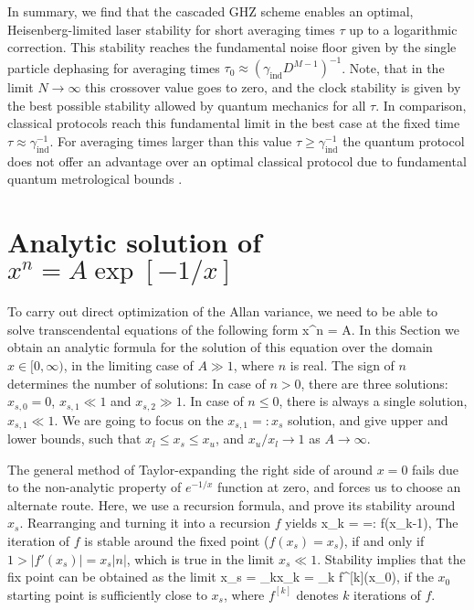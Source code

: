 In summary, we find that the cascaded GHZ scheme enables an optimal,
Heisenberg-limited laser stability for short averaging times $\tau$ up to a
logarithmic correction. This stability reaches the fundamental noise floor given
by the single particle dephasing for averaging times $\tau_0 \approx
(\gamma_\mathrm{ind}D^{M-1} )^{-1}$. Note, that in the limit $N\rightarrow
\infty$ this crossover value goes to zero, and the clock stability is given by
the best possible stability allowed by quantum mechanics for all $\tau$. In
comparison, classical protocols reach this fundamental limit in the best case
\cite{Rosenband2013} at the fixed time $\tau \approx \gamma_\mathrm{ind}^{-1}$.
For averaging times larger than this value $\tau\geq \gamma_\mathrm{ind}^{-1}$
the quantum protocol does not offer an advantage over an optimal classical
protocol due to fundamental quantum metrological bounds \cite{Escher:2011fn}.

\section{Analytic solution of $x^n = A\exp[-1/x]$}
\label{sec:Transcendental eq}
To carry out direct optimization of the Allan variance, we need to be able to
solve transcendental equations of the following form
\bel
	\label{eq:Transcendental_eq}
	x^n = A\exp{}.
\eel
In this Section we obtain an analytic formula for the solution of this equation
over the domain $x\in [0,\infty)$, in the limiting case of $A \gg 1$, where $n$
is real. The sign of $n$ determines the number of solutions: In case of $n>0$,
there are three solutions: $x_{s,0} = 0$, $x_{s,1}\ll 1$ and $x_{s,2}\gg 1$. In
case of $n\leq 0$, there is always a single solution, $x_{s,1} \ll 1$. We are
going to focus on the $x_{s,1} =: x_s$ solution, and give upper and lower
bounds, such that $x_l \leq x_s \leq x_u$, and $x_u/x_l \rightarrow 1$ as $A\rightarrow
\infty$.

The general method of Taylor-expanding the
right side of   around $x=0$ fails due to the
non-analytic property of $e^{-1/x}$ function at zero, and forces us to choose an
alternate route. Here, we use a recursion formula, and prove its stability
around $x_s$. Rearranging  and turning it into
a recursion $f$ yields
\bel
	\label{eq:recursion}
	x_{k} =
	 =: f(x_{k-1}),
\eel 
The iteration of $f$ is stable around the
fixed point ($f(x_s) = x_s$), if and only if $1 > |f'(x_s)| = x_s |n|$,
which is true in the limit $x_s \ll 1$. Stability implies that the fix point can
be obtained as the limit
\bel
	x_s = \lim_{k\rightarrow \infty}x_k = \lim_{k\rightarrow \infty} f^{[k]}(x_0),
\eel
if the $x_0$ starting point is sufficiently close to $x_s$,  where $f^{[k]}$
denotes $k$ iterations of $f$.

